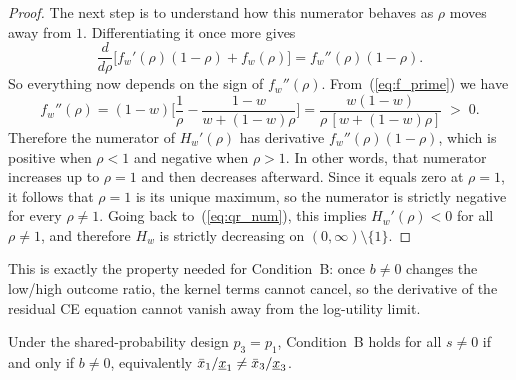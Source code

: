 \begin{proof}
The next step is to understand how this numerator behaves as $\rho$ moves away
from $1$. Differentiating it once more gives
\begin{equation}\label{eq:qr_deriv}
  \frac{d}{d\rho}\bigl[f_w'(\rho)(1-\rho) + f_w(\rho)\bigr]
  = f_w''(\rho)(1-\rho).
\end{equation}
So everything now depends on the sign of $f_w''(\rho)$. From~(\ref{eq:f_prime})
we have
\begin{equation}\label{eq:f_double_prime}
  f_w''(\rho)
  = (1{-}w)\biggl[
      \frac{1}{\rho}
      - \frac{1{-}w}{w{+}(1{-}w)\rho}
    \biggr]
  = \frac{w(1{-}w)}
         {\rho\,[w{+}(1{-}w)\rho]}
  \;>\; 0.
\end{equation}
Therefore the numerator of $H_w'(\rho)$ has derivative
$f_w''(\rho)(1-\rho)$, which is positive when $\rho < 1$ and negative when
$\rho > 1$. In other words, that numerator increases up to $\rho = 1$ and then
decreases afterward. Since it equals zero at $\rho = 1$, it follows that
$\rho = 1$ is its unique maximum, so the numerator is strictly negative for
every $\rho \neq 1$. Going back to~(\ref{eq:qr_num}), this implies
$H_w'(\rho) < 0$ for all $\rho \neq 1$, and therefore $H_w$ is strictly decreasing on
$(0,\infty) \setminus \{1\}$.
\end{proof}

This is exactly the property needed for Condition~B: once $b \neq 0$ changes
the low/high outcome ratio, the kernel terms cannot cancel, so the derivative
of the residual CE equation cannot vanish away from the log-utility limit.

\begin{proposition}
\label{prop:shared_prob_condB}
Under the shared-probability design $p_3 = p_1$, Condition~B holds for all
$s \neq 0$ if and only if $b \neq 0$, equivalently
$\bar{x}_1/\underline{x}_1 \neq \bar{x}_3/\underline{x}_3$.
\end{proposition}

